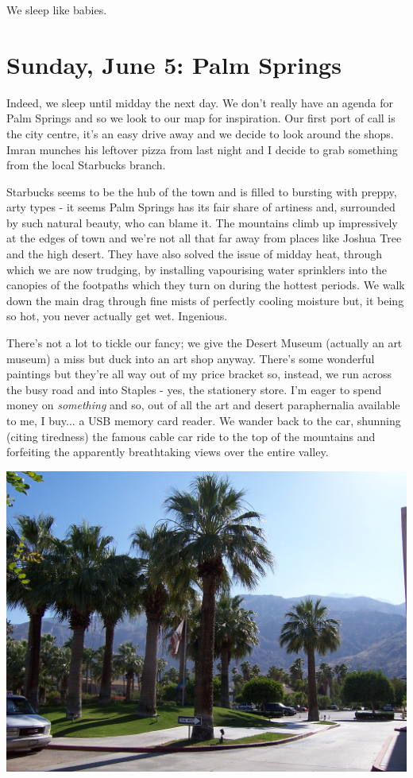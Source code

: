 \documentclass[a5paper,titlepage,11pt,draft]{book}
\begin{document}
We sleep like babies.

\chapter[Palm Springs]{Sunday, June 5:  Palm Springs}
Indeed, we sleep until midday the next day.  We don't really have an agenda for Palm Springs and so we look to our map for inspiration.  Our first port of call is the city centre, it's an easy drive away and we decide to look around the shops.  Imran munches his leftover pizza from last night and I decide to grab something from the local Starbucks branch.

Starbucks seems to be the hub of the town and is filled to bursting with preppy, arty types - it seems Palm Springs has its fair share of artiness and, surrounded by such natural beauty, who can blame it.  The mountains climb up impressively at the edges of town and we're not all that far away from places like Joshua Tree and the high desert.  They have also solved the issue of midday heat, through which we are now trudging, by installing vapourising water sprinklers into the canopies of the footpaths which they turn on during the hottest periods.  We walk down the main drag through fine mists of perfectly cooling moisture but, it being so hot, you never actually get wet.  Ingenious.

There's not a lot to tickle our fancy; we give the Desert Museum (actually an art museum) a miss but duck into an art shop anyway.  There's some wonderful paintings but they're all way out of my price bracket so, instead, we run across the busy road and into Staples - yes, the stationery store.  I'm eager to spend money on \emph{something} and so, out of all the art and desert paraphernalia available to me, I buy... a USB memory card reader.  We wander back to the car, shunning (citing tiredness) the famous cable car ride to the top of the mountains and forfeiting the apparently breathtaking views over the entire valley.

\begin{center}\includegraphics[width=\textwidth]{gfx/100_1625}\end{center}
\end{document}
